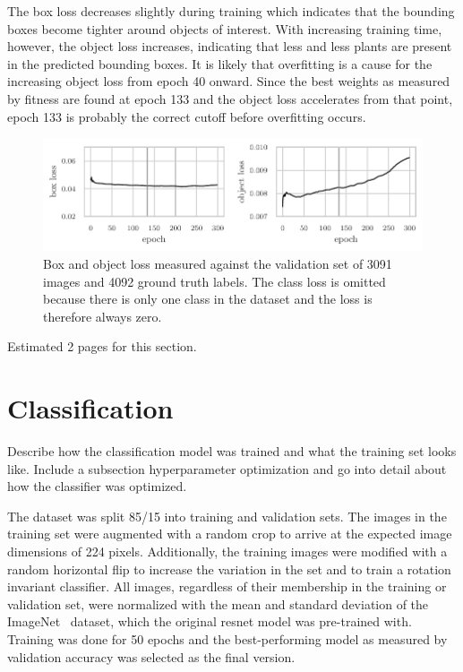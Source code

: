 \documentclass[draft,final]{vutinfth} %
\begin{document}
The box loss decreases slightly during training which indicates that
the bounding boxes become tighter around objects of interest. With
increasing training time, however, the object loss increases,
indicating that less and less plants are present in the predicted
bounding boxes. It is likely that overfitting is a cause for the
increasing object loss from epoch 40 onward. Since the best weights as
measured by fitness are found at epoch 133 and the object loss
accelerates from that point, epoch 133 is probably the correct cutoff
before overfitting occurs.

\begin{figure}
  \centering
  \includegraphics{graphics/val_box_obj_loss.pdf}
  \caption[Object detection box and object loss.]{Box and object loss
    measured against the validation set of 3091 images and 4092 ground
    truth labels. The class loss is omitted because there is only one
    class in the dataset and the loss is therefore always zero.}
  \label{fig:box-obj-loss}
\end{figure}

Estimated 2 pages for this section.

\section{Classification}
\label{sec:development-classification}

Describe how the classification model was trained and what the
training set looks like. Include a subsection hyperparameter
optimization and go into detail about how the classifier was
optimized.

The dataset was split 85/15 into training and validation sets. The
images in the training set were augmented with a random crop to arrive
at the expected image dimensions of 224 pixels. Additionally, the
training images were modified with a random horizontal flip to
increase the variation in the set and to train a rotation invariant
classifier. All images, regardless of their membership in the training
or validation set, were normalized with the mean and standard
deviation of the ImageNet~\cite{deng2009} dataset, which the original
\gls{resnet} model was pre-trained with. Training was done for 50
epochs and the best-performing model as measured by validation
accuracy was selected as the final version.
\end{document}
